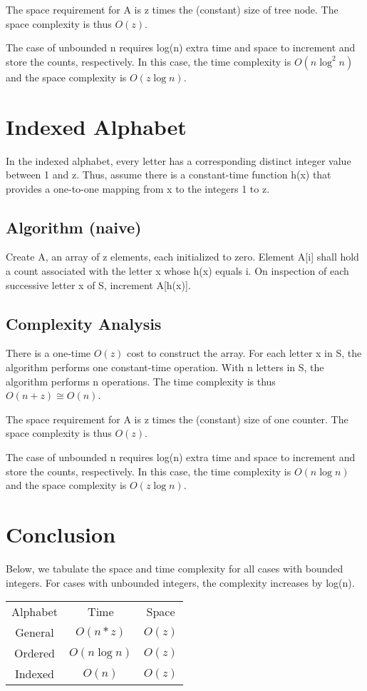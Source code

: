 \documentclass{article}
\begin{document}
\begin{multicols}{2}
The space requirement for A is z times the (constant) size of tree node.
The space complexity is thus $O(z)$.

The case of unbounded n requires log(n) extra time and space to increment and store the counts, respectively.
In this case, the time complexity is $O(n\log^2{}n)$ and the space complexity is $O(z\log{}n)$.
\section{Indexed Alphabet}
In the indexed alphabet, every letter has a corresponding distinct integer value between 1 and z.
Thus, assume there is a constant-time function h(x) that provides a one-to-one mapping from x to the integers 1 to z.  
\subsection{Algorithm (naive)}
Create A, an array of z elements, each initialized to zero.
Element A[i] shall hold a count associated with the letter x whose h(x) equals i.
On inspection of each successive letter x of S, increment A[h(x)].
\subsection{Complexity Analysis}
There is a one-time $O(z)$ cost to construct the array.
For each letter x in S, the algorithm performs one constant-time operation. 
With n letters in S, the algorithm performs n operations.
The time complexity is thus $O(n+z) \cong O(n)$.

The space requirement for A is z times the (constant) size of one counter.
The space complexity is thus $O(z)$.

The case of unbounded n requires log(n) extra time and space to increment and store the counts, respectively.
In this case, the time complexity is $O(n\log{}n)$ and the space complexity is $O(z\log{}n)$.
\section{Conclusion}
Below, we tabulate the space and time complexity for all cases with bounded integers.
For cases with unbounded integers, the complexity increases by log(n).
\begin{center}
\begin{tabularx}{\textwidth}{ | c | c | c | } 
 Alphabet  & Time  & Space  \\
 General  & $O(n*z)$   & $O(z)$  \\
 Ordered  & $O(n\log{}n)$ & $O(z)$  \\
 Indexed  & $O(n)$  & $O(z)$  
\end{tabularx}
\end{center}

\end{multicols}
\end{document}
